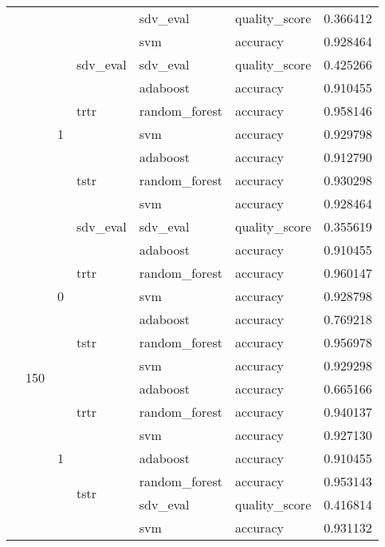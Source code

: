\begin{longtable}{llllllr}
\cline{5-7}
 &  &  &  & sdv_eval & quality_score & 0.366412 \\
\cline{5-7}
 &  &  &  & svm & accuracy & 0.928464 \\
\cline{3-7} \cline{4-7} \cline{5-7}
 &  & \multirow[t]{7}{*}{1} & sdv_eval & sdv_eval & quality_score & 0.425266 \\
\cline{4-7} \cline{5-7}
 &  &  & \multirow[t]{3}{*}{trtr} & adaboost & accuracy & 0.910455 \\
\cline{5-7}
 &  &  &  & random_forest & accuracy & 0.958146 \\
\cline{5-7}
 &  &  &  & svm & accuracy & 0.929798 \\
\cline{4-7} \cline{5-7}
 &  &  & \multirow[t]{3}{*}{tstr} & adaboost & accuracy & 0.912790 \\
\cline{5-7}
 &  &  &  & random_forest & accuracy & 0.930298 \\
\cline{5-7}
 &  &  &  & svm & accuracy & 0.928464 \\
\cline{2-7} \cline{3-7} \cline{4-7} \cline{5-7}
 & \multirow[t]{14}{*}{150} & \multirow[t]{7}{*}{0} & sdv_eval & sdv_eval & quality_score & 0.355619 \\
\cline{4-7} \cline{5-7}
 &  &  & \multirow[t]{3}{*}{trtr} & adaboost & accuracy & 0.910455 \\
\cline{5-7}
 &  &  &  & random_forest & accuracy & 0.960147 \\
\cline{5-7}
 &  &  &  & svm & accuracy & 0.928798 \\
\cline{4-7} \cline{5-7}
 &  &  & \multirow[t]{3}{*}{tstr} & adaboost & accuracy & 0.769218 \\
\cline{5-7}
 &  &  &  & random_forest & accuracy & 0.956978 \\
\cline{5-7}
 &  &  &  & svm & accuracy & 0.929298 \\
\cline{3-7} \cline{4-7} \cline{5-7}
 &  & \multirow[t]{7}{*}{1} & \multirow[t]{3}{*}{trtr} & adaboost & accuracy & 0.665166 \\
\cline{5-7}
 &  &  &  & random_forest & accuracy & 0.940137 \\
\cline{5-7}
 &  &  &  & svm & accuracy & 0.927130 \\
\cline{4-7} \cline{5-7}
 &  &  & \multirow[t]{4}{*}{tstr} & adaboost & accuracy & 0.910455 \\
\cline{5-7}
 &  &  &  & random_forest & accuracy & 0.953143 \\
\cline{5-7}
 &  &  &  & sdv_eval & quality_score & 0.416814 \\
\cline{5-7}
 &  &  &  & svm & accuracy & 0.931132 \\
\cline{1-7} \cline{2-7} \cline{3-7} \cline{4-7} \cline{5-7}
\end{longtable}
